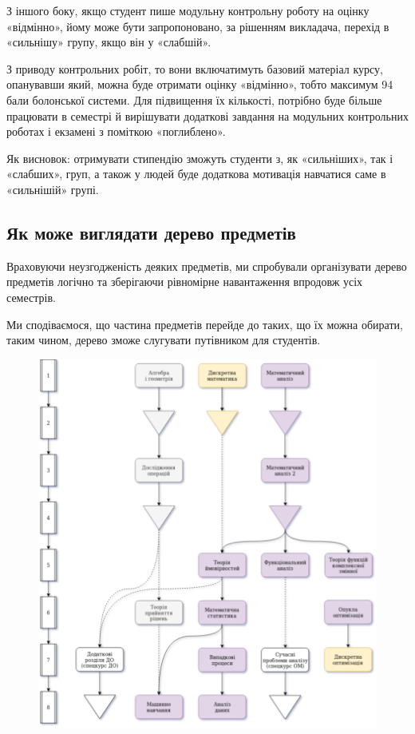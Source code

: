 \documentclass[14pt, a4paper]{extarticle}  %
\begin{document}
З іншого боку, якщо студент пише модульну контрольну роботу на оцінку «відмінно», йому може бути запропоновано, за рішенням викладача, перехід в «сильнішу» групу, якщо він у «слабшій».

З приводу контрольних робіт, то вони включатимуть базовий матеріал курсу, опанувавши який, можна буде отримати оцінку «відмінно», тобто максимум 94 бали болонської системи. Для підвищення їх кількості, потрібно буде більше працювати в семестрі й вирішувати додаткові завдання на модульних контрольних роботах і екзамені з поміткою «поглиблено».

Як висновок: отримувати стипендію зможуть студенти з, як «сильніших», так і «слабших», груп, а також у людей буде додаткова мотивація навчатися саме в «сильнішій» групі.

\subsection{Як може виглядати дерево предметів}
Враховуючи неузгодженість деяких предметів, ми спробували організувати дерево предметів логічно та зберігаючи рівномірне навантаження впродовж усіх семестрів.

Ми сподіваємося, що частина предметів перейде до таких, що їх можна обирати, таким чином, дерево зможе слугувати путівником для студентів. 

\begin{figure}[ht]
\centering
\includegraphics[scale=0.57]{CourseworkTree_1.png}
\end{figure}
\end{document}
